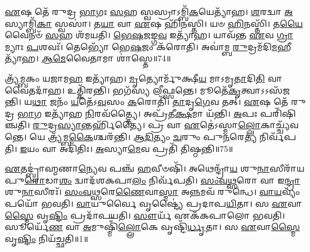 \-\ul{𑌏}\-𑌷 𑌤𑍇᳴ 𑌰𑍁𑌦𑍍𑌰 \ul{𑌭𑌾}\-𑌗𑌃 \ul{𑌸}\-𑌹 𑌸𑍍𑌵𑌸𑍍𑌰𑌾\-𑌽𑌮𑍍𑌬𑌿᳴\-\ul{𑌕}\-𑌯𑍇𑌤𑍍𑌯𑌾᳴𑌹।
\-\ul{𑌶}\-𑌰𑌦𑍍𑌵𑌾 \ul{𑌅}\-𑌸𑍍𑌯𑌾𑌮𑍍𑌬𑌿᳴\-\ul{𑌕𑌾} 𑌸𑍍𑌵𑌸𑌾॑।
𑌤\-\ul{𑌯𑌾} 𑌵𑌾 \ul{𑌏}\-𑌷 𑌹𑌿᳴𑌨𑌸𑍍𑌤𑌿।
𑌯𑍞 \ul{𑌹𑌿}\-𑌨𑌸𑍍𑌤𑌿᳴।
𑌤\-\ul{𑌯𑍈}\-𑌵𑍈𑌨𑍞᳴ \ul{𑌸}\-𑌹 𑌶᳴𑌮𑌯𑌤𑌿।
\-\ul{𑌭𑍇}\-\-\ul{𑌷}\-𑌜𑌙𑍍𑌗\-\ul{𑌵} 𑌇𑌤𑍍𑌯𑌾᳴𑌹।
𑌯𑌾𑌵᳴𑌨𑍍𑌤 \ul{𑌏}\-𑌵 \ul{𑌗𑍍𑌰𑌾}\-𑌮𑍍𑌯𑌾𑌃 \ul{𑌪}\-𑌶𑌵𑌃᳴।
𑌤𑍇𑌭𑍍𑌯𑍋᳴ 𑌭𑍇\-\ul{𑌷}\-𑌜𑌂 𑌕᳴𑌰𑍋𑌤𑌿।
𑌅𑌵𑌾॑𑌮𑍍𑌬 \ul{𑌰𑍁}\-𑌦𑍍𑌰𑌮᳴𑌦𑌿\-\ul{𑌮}\-𑌹𑍀𑌤𑍍𑌯𑌾᳴𑌹।
\-\ul{𑌆}\-\-\-\ul{𑌮𑍇}\-𑌵𑍈𑌤𑌾𑌮𑌾 𑌶𑌾॑𑌸𑍍𑌤𑍇॥74॥

𑌤𑍍𑌰𑍍𑌯᳴𑌮𑍍𑌬𑌕𑌂 𑌯𑌜𑌾𑌮\-\ul{𑌹} 𑌇𑌤𑍍𑌯𑌾᳴𑌹।
\-\ul{𑌮𑍃}\-𑌤𑍍𑌯𑍋𑌰𑍍𑌮𑍁᳴𑌕𑍍𑌷𑍀\-\ul{𑌯} 𑌮𑌾𑌽𑌮𑍃\-\ul{𑌤𑌾}\-𑌦𑌿\-\ul{𑌤𑌿} 𑌵𑌾𑌵𑍈𑌤𑌦𑌾᳴𑌹।
𑌉𑌤𑍍𑌕𑌿᳴𑌰𑌨𑍍𑌤𑌿।
𑌭𑌗᳴𑌸𑍍𑌯 𑌲𑍀𑌫𑍍𑌸𑌨𑍍𑌤𑍇।
𑌮𑍂𑌤𑍇᳴\-\ul{𑌕𑍃}\-𑌤𑍍𑌵𑌾\-𑌽𑌽𑌸᳴𑌜𑌨𑍍𑌤𑌿।
𑌯\-\ul{𑌥𑌾} 𑌜𑌨𑌂᳴ \ul{𑌯}\-𑌤𑍇᳴\-𑌽\-\ul{𑌵}\-𑌸𑌂 \ul{𑌕}\-𑌰𑍋𑌤𑌿᳴।
\-\ul{𑌤𑌾}\-𑌦𑍃\-\ul{𑌗𑍇}\-𑌵 𑌤𑌤𑍍।
\-\ul{𑌏}\-𑌷 𑌤𑍇᳴ 𑌰𑍁𑌦𑍍𑌰 \ul{𑌭𑌾}\-𑌗 𑌇𑌤𑍍𑌯𑌾᳴𑌹 \ul{𑌨𑌿}\-𑌰𑌵᳴𑌤𑍍𑌤𑍍𑌯𑍈।
𑌅𑌪𑍍𑌰᳴𑌤𑍀\-\ul{𑌕𑍍𑌷}\-𑌮𑌾 𑌯᳴𑌨𑍍𑌤𑌿।
\-\ul{𑌅}\-𑌪𑌃 𑌪𑌰𑌿᳴𑌷𑌿𑌞𑍍𑌚𑌤𑌿।
\-\ul{𑌰𑍁}\-𑌦𑍍𑌰\-\ul{𑌸𑍍𑌯𑌾}\-𑌨𑍍𑌤𑌰𑍍\mbox{}𑌹𑌿᳴𑌤𑍍𑌯𑍈।
𑌪𑍍𑌰 𑌵𑌾 \ul{𑌏}\-𑌤𑍇॑\-𑌽𑌸𑍍𑌮𑌾\-\ul{𑌲𑍍𑌲𑍋}\-𑌕𑌾𑌚𑍍𑌚𑍍𑌯᳴𑌵𑌨𑍍𑌤𑍇।
𑌯𑍇 𑌤𑍍𑌰𑍍𑌯᳴𑌮𑍍𑌬\-\ul{𑌕𑍈}\-𑌶𑍍𑌚𑌰᳴𑌨𑍍𑌤𑌿।
\-\ul{𑌆}\-\-\ul{𑌦𑌿}\-𑌤𑍍𑌯𑌂 \ul{𑌚}\-𑌰𑍁𑌂 𑌪𑍁\-\ul{𑌨}\-𑌰𑍇\-\ul{𑌤𑍍𑌯} 𑌨𑌿𑌰𑍍𑌵᳴𑌪𑌤𑌿।
\-\ul{𑌇}\-𑌯𑌂 𑌵𑌾 𑌅𑌦𑌿᳴𑌤𑌿𑌃।
\-\ul{𑌅}\-𑌸𑍍𑌯𑌾\-\ul{𑌮𑍇}\-𑌵 𑌪𑍍𑌰𑌤𑌿᳴ 𑌤𑌿𑌷𑍍𑌠𑌨𑍍𑌤𑌿॥75॥\anuvakamend[\-\ul{𑌯}\-\-\ul{𑌨𑍍𑌤𑌿} \ul{𑌬𑍍𑌰𑍂}\-\-\ul{𑌯𑌾}\-\-\ul{𑌨𑍍𑌨𑌿}\-𑌰𑌵᳴𑌦𑌯𑌤𑍇 𑌶𑌾𑌸𑍍𑌤𑍇 𑌸𑌿𑌞𑍍𑌚\-\ul{𑌤𑌿} 𑌷𑌟𑍍𑌚᳴]




\clearpage
{}
\setcounter{anuvakam}{0}

\-\ul{𑌏}\-𑌤𑌦𑍍𑌬𑍍𑌰𑌾॑𑌹𑍍𑌮𑌣𑌾\-\ul{𑌨𑍍𑌯𑍇}\-𑌵 𑌪𑌞𑍍𑌚᳴ \ul{𑌹}\-𑌵𑍀𑍞𑌷𑌿᳴।
𑌅𑌥𑍇𑌨𑍍𑌦𑍍𑌰𑌾᳴\-\ul{𑌯} 𑌶𑍁\-\ul{𑌨𑌾}\-𑌸𑍀𑌰𑌾᳴𑌯 𑌪𑍁\-\ul{𑌰𑍋}\-𑌡𑌾\-\ul{𑌶𑌂} 𑌦𑍍𑌵𑌾𑌦᳴𑌶𑌕𑌪𑌾\-\ul{𑌲𑌂} 𑌨𑌿𑌰𑍍𑌵᳴𑌪𑌤𑌿।
\-\ul{𑌸𑌂}\-\-\ul{𑌵}\-\-\ul{𑌥𑍍𑌸}\-𑌰𑍋 𑌵𑌾 𑌇\-\ul{𑌨𑍍𑌦𑍍𑌰𑌾}\-𑌶𑍁\-\ul{𑌨𑌾}\-𑌸𑍀𑌰𑌃᳴।
\-\ul{𑌸𑌂}\-\-\ul{𑌵}\-\-\ul{𑌥𑍍𑌸}\-𑌰𑍇\-\ul{𑌣𑍈}\-𑌵𑌾\-\ul{𑌸𑍍𑌮𑌾} 𑌅\-\ul{𑌨𑍍𑌨}\-𑌮𑌵᳴ 𑌰𑍁𑌨𑍍𑌧𑍇।
\-\ul{𑌵𑌾}\-\-\ul{𑌯}\-𑌵𑍍𑌯𑌂᳴ 𑌪𑌯𑍋᳴ 𑌭𑌵𑌤𑌿।
\-\ul{𑌵𑌾}\-𑌯𑍁𑌰𑍍𑌵𑍈 𑌵𑍃𑌷𑍍𑌟𑍍𑌯𑍈॑ 𑌪𑍍𑌰𑌦𑌾𑌪\-\ul{𑌯𑌿}\-𑌤𑌾।
𑌸 \ul{𑌏}\-𑌵𑌾\-\ul{𑌸𑍍𑌮𑍈} 𑌵𑍃\-\ul{𑌷𑍍𑌟𑌿𑌂} 𑌪𑍍𑌰𑌦𑌾᳴𑌪𑌯𑌤𑌿।
\-\ul{𑌸𑍗}\-𑌰𑍍𑌯᳴ 𑌏𑌕᳴𑌕𑌪𑌾𑌲𑍋 𑌭𑌵𑌤𑌿।
𑌸𑍂𑌰𑍍𑌯𑍇᳴\-\ul{𑌣} 𑌵𑌾 \ul{𑌅}\-𑌮𑍁𑌷𑍍𑌮𑌿𑌁᳴\-\ul{𑌲𑍍𑌲𑍋}\-𑌕𑍇 𑌵𑍃𑌷𑍍𑌟𑌿᳴\-\ul{𑌰𑍍𑌧𑍃}\-𑌤𑌾।
𑌸 \ul{𑌏}\-𑌵𑌾\-\ul{𑌸𑍍𑌮𑍈} 𑌵𑍃\-\ul{𑌷𑍍𑌟𑌿𑌂} 𑌨𑌿𑌯᳴𑌚𑍍𑌛𑌤𑌿॥1॥

